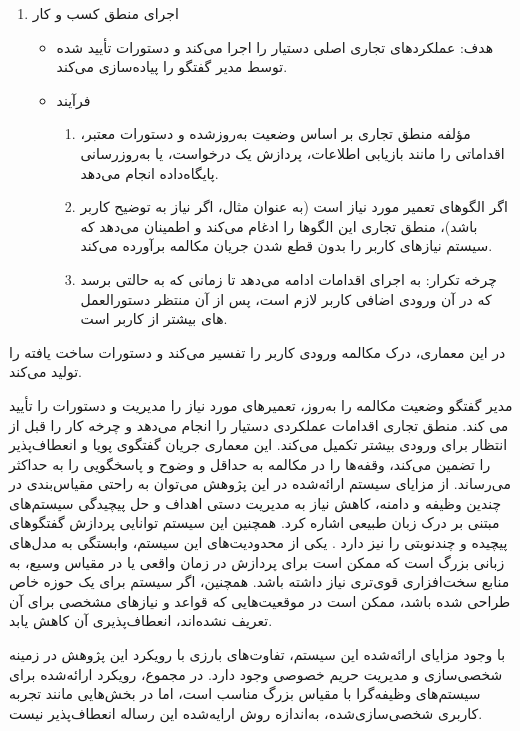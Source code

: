 \begin{enumerate}
\begin{itemize}
\end{itemize}

\item
اجرای منطق کسب و کار
\begin{itemize}
\item
هدف: عملکردهای تجاری اصلی دستیار را اجرا می‌کند و دستورات تأیید شده توسط مدیر گفتگو را پیاده‌سازی می‌کند.
\item
فرآیند
\begin{enumerate}
\item
مؤلفه منطق تجاری بر اساس وضعیت به‌روزشده و دستورات معتبر، اقداماتی را مانند بازیابی اطلاعات، پردازش یک درخواست، یا به‌روزرسانی پایگا‌ه‌داده انجام می‌دهد.
\item
 اگر الگوهای تعمیر مورد نیاز است (به عنوان مثال، اگر نیاز به توضیح کاربر باشد)، منطق تجاری این الگوها را ادغام می‌کند و اطمینان می‌دهد که سیستم نیازهای کاربر را بدون قطع شدن جریان مکالمه برآورده می‌کند.
\item
چرخه تکرار: به اجرای اقدامات ادامه می‌دهد تا زمانی که به حالتی برسد که در آن ورودی اضافی کاربر لازم است، پس از آن منتظر دستورالعمل های بیشتر از کاربر است.
\end{enumerate}
\end{itemize}
\end{enumerate}
در این معماری، درک مکالمه%
 ورودی کاربر را تفسیر می‌کند و دستورات ساخت یافته را تولید می‌کند.

مدیر گفتگو وضعیت مکالمه را به‌روز، تعمیرهای مورد نیاز را مدیریت و دستورات را تأیید می کند.
منطق تجاری اقدامات عملکردی دستیار را انجام می‌دهد و چرخه کار را قبل از انتظار برای ورودی بیشتر تکمیل می‌کند.
این معماری جریان گفتگوی پویا و انعطاف‌پذیر را تضمین می‌کند، وقفه‌ها را در مکالمه به حداقل و وضوح و پاسخگویی را به حداکثر می‌رساند.
\newline
از مزایای سیستم ارائه‌شده در این پژوهش می‌توان به راحتی مقیاس‌بندی در چندین وظیفه و دامنه، کاهش نیاز به مدیریت دستی اهداف و حل پیچیدگی سیستم‌های مبتنی بر درک زبان طبیعی اشاره کرد. همچنین این سیستم توانایی پردازش گفتگوهای پیچیده و چندنوبتی را نیز دارد .
\newline
یکی از محدودیت‌های این سیستم، وابستگی به مدل‌های زبانی بزرگ است که ممکن است برای پردازش در زمان واقعی یا در مقیاس وسیع، به منابع سخت‌افزاری قوی‌تری نیاز داشته باشد. همچنین، اگر سیستم برای یک حوزه خاص طراحی شده باشد، ممکن است در موقعیت‌هایی که قواعد و نیازهای مشخصی برای آن تعریف نشده‌اند، انعطاف‌پذیری آن کاهش یابد.

با وجود مزایای ارائه‌شده این سیستم، تفاوت‌های بارزی با رویکرد این پژوهش در زمینه شخصی‌سازی و مدیریت حریم خصوصی وجود دارد. در مجموع، رویکرد ارائه‌شده برای سیستم‌های وظیفه‌گرا با مقیاس بزرگ مناسب است، اما در بخش‌هایی مانند تجربه کاربری شخصی‌سازی‌شده، به‌اندازه روش ارایه‌شده این رساله انعطاف‌پذیر نیست.


